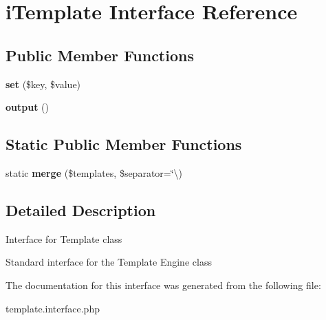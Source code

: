 \hypertarget{interface_w_a_f_f_l_e_1_1_framework_1_1_interfaces_1_1i_template}{}\section{i\+Template Interface Reference}
\label{interface_w_a_f_f_l_e_1_1_framework_1_1_interfaces_1_1i_template}
\subsection*{Public Member Functions}
\begin{DoxyCompactItemize}
\item 
\mbox{\label{interface_w_a_f_f_l_e_1_1_framework_1_1_interfaces_1_1i_template_aab787bd83f84f4215dceb35f7c305eee}} 
{\bfseries set} (\$key, \$value)
\item 
\mbox{\label{interface_w_a_f_f_l_e_1_1_framework_1_1_interfaces_1_1i_template_a3939045b11b9aaefdf692feb963f0dfc}} 
{\bfseries output} ()
\end{DoxyCompactItemize}
\subsection*{Static Public Member Functions}
\begin{DoxyCompactItemize}
\item 
\mbox{\label{interface_w_a_f_f_l_e_1_1_framework_1_1_interfaces_1_1i_template_a35932dacc685dbaaf413695f6dd67f36}} 
static {\bfseries merge} (\$templates, \$separator=\char`\"{}\textbackslash{})
\end{DoxyCompactItemize}


\subsection{Detailed Description}
Interface for Template class

Standard interface for the Template Engine class 

The documentation for this interface was generated from the following file\+:\begin{DoxyCompactItemize}
\item 
template.\+interface.\+php\end{DoxyCompactItemize}
